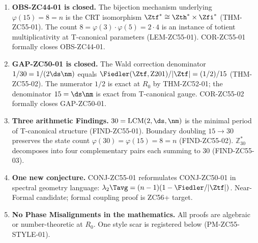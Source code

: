 \documentclass[12pt, a4paper]{article}
\begin{document}
\begin{enumerate}[leftmargin=2em]

\item \textbf{OBS-ZC44-01 is closed.}
  The bijection mechanism underlying $\varphi(15)=8=n$
  is the CRT isomorphism $\Ztf^*\cong\Zth^*\times\Zfi^*$
  (THM-ZC55-01).  The count $8=\varphi(3)\cdot\varphi(5)=2\cdot4$
  is an instance of totient multiplicativity at T-canonical
  parameters (LEM-ZC55-01).  COR-ZC55-01 formally closes
  OBS-ZC44-01.

\item \textbf{GAP-ZC50-01 is closed.}
  The Wald correction denominator $1/30=1/(2\ds\nm)$
  equals $\Fiedler(\Ztf,\mathrm{Z201})/|\Ztf|=(1/2)/15$
  (THM-ZC55-02).  The numerator $1/2$ is exact at $R_0$
  by THM-ZC52-01; the denominator $15=\ds\nm$ is exact
  from T-canonical gauge.  COR-ZC55-02 formally closes
  GAP-ZC50-01.

\item \textbf{Three arithmetic Findings.}
  $30=\mathrm{LCM}(2,\ds,\nm)$ is the minimal period of
  T-canonical structure (FIND-ZC55-01).
  Boundary doubling $15\to30$ preserves the state count
  $\varphi(30)=\varphi(15)=8=n$ (FIND-ZC55-02).
  $\mathbb{Z}_{30}^*$ decomposes into four complementary
  pairs each summing to $30$ (FIND-ZC55-03).

\item \textbf{One new conjecture.}
  CONJ-ZC55-01 reformulates CONJ-ZC50-01 in spectral
  geometry language: $\lambda_2\Tavg=(n-1)(1-\Fiedler/|\Ztf|)$.
  Near-Formal candidate; formal coupling proof is ZC56+ target.

\item \textbf{No Phase Misalignments in the mathematics.}
  All proofs are algebraic or number-theoretic at $R_0$.
  One style scar is registered below (PM-ZC55-STYLE-01).

\end{enumerate}
\end{document}

